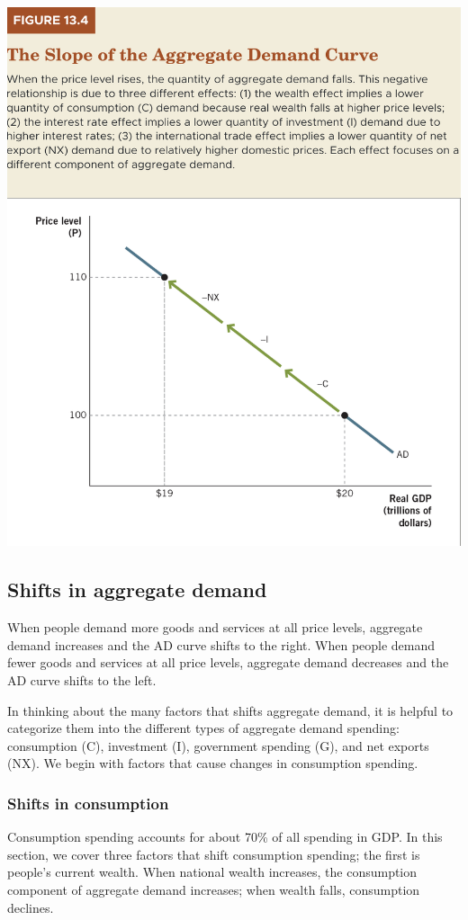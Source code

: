 \documentclass[11pt]{article} %
\begin{document}
\begin{center}
\includegraphics[scale=0.5]{images/Figure 13.4.png} 
\end{center}

\subsection*{Shifts in aggregate demand}
When people demand more goods and services at all price levels, aggregate demand increases and the AD curve shifts to the right. When people demand fewer goods and services at all price levels, aggregate demand decreases and the AD curve shifts to the left.

In thinking about the many factors that shifts aggregate demand, it is helpful to categorize them into the different types of aggregate demand spending: consumption (C), investment (I), government spending (G), and net exports (NX). We begin with factors that cause changes in consumption spending.

\subsubsection*{Shifts in consumption}
Consumption spending accounts for about 70\% of all spending in GDP. In this section, we cover three factors that shift consumption spending; the first is people's current wealth. When national wealth increases, the consumption component of aggregate demand increases; when wealth falls, consumption declines.
\end{document}
